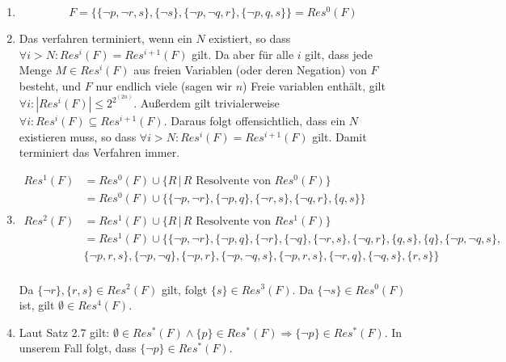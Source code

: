 \begin{enumerate}[1)]
	\item $$ F = \{\{\lnot p,\lnot r, s\},\{\lnot s\},\{\lnot p,\lnot q, r\},\{\lnot p, q, s\}\} = Res^0(F)$$
	\item Das verfahren terminiert, wenn ein $N$ existiert, so dass $\forall i > N : Res^i(F) = Res^{i+1}(F)$ gilt. Da aber für alle $i$ gilt, dass jede Menge $M \in Res^i(F)$ aus freien Variablen (oder deren Negation) von $F$ besteht, und $F$ nur endlich viele (sagen wir $n$) Freie variablen enthält, gilt $\forall i : |Res^i(F)| \leq 2^{2^{(2n)}}$. Außerdem gilt trivialerweise $\forall i : Res^i(F) \subseteq Res^{i+1}(F)$. Daraus folgt offensichtlich, dass ein $N$ existieren muss, so dass $\forall i > N : Res^i(F) = Res^{i+1}(F)$ gilt. Damit terminiert das Verfahren immer.
	\item \begin{align*}
		Res^1(F) & = Res^0(F) \cup \{R \,|\, R \text{ Resolvente von } Res^0(F)\} \\
		         & = Res^0(F) \cup \{\{\lnot p, \lnot r\},\{\lnot p, q\},\{\lnot r, s\},\{ \lnot q, r\},\{ q,s\}\} \\ \\
		Res^2(F) & = Res^1(F) \cup \{R \,|\, R \text{ Resolvente von } Res^1(F)\} \\
		         & = Res^1(F) \cup \{\{\lnot p, \lnot r \},\{ \lnot p, q \},\{ \lnot r \},\{ \lnot q \},\{ \lnot r, s \},\{ \lnot q, r \},\{ q,s \},\{ q \},\{ \lnot p, \lnot q, s \},\\ &\{ \lnot p, r, s \},\{ \lnot p, \lnot q \},\{ \lnot p, r \},\{ \lnot p, \lnot q, s \},\{ \lnot p, r, s \},\{ \lnot r, q \},\{ \lnot q, s \},\{ r,s \}\}\\
	\end{align*}
	
	Da $\{\lnot r\}, \{r, s\} \in Res^2(F)$ gilt, folgt $\{s\} \in Res^3(F)$. Da $\{\lnot s\} \in Res^0(F)$ ist, gilt $\emptyset \in Res^4(F)$.
	\item  Laut Satz 2.7 gilt: $\emptyset \in Res^*(F) \land \{p\} \in Res^*(F) \Rightarrow \{\lnot p\} \in Res^*(F)$. In unserem Fall folgt, dass $\{\lnot p\} \in Res^*(F)$.
\end{enumerate}

\vfill\centering
